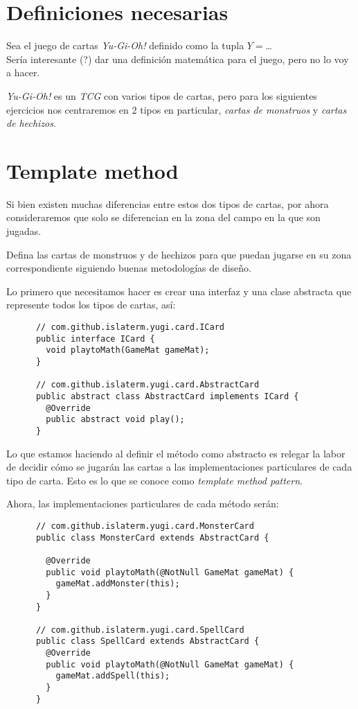 \section{Definiciones necesarias}
  Sea el juego de cartas \textit{Yu-Gi-Oh!} definido como la tupla 
  $Y = $\dots\\
  Sería interesante (?) dar una definición matemática para el juego, pero no lo voy a 
  hacer.

  \textit{Yu-Gi-Oh!} es un \textit{TCG} con varios tipos de cartas, pero para los 
  siguientes ejercicios nos centraremos en 2 tipos en particular, \textit{cartas de 
  monstruos} y \textit{cartas de hechizos}.

\section{Template method}
  \begin{Exercise}[title={Zonas de juego}, label={ex1}]
    Si bien existen muchas diferencias entre estos dos tipos de cartas, por ahora 
    consideraremos que solo se diferencian en la zona del campo en la que son jugadas.

    Defina las cartas de monstruos y de hechizos para que puedan jugarse en su zona 
    correspondiente siguiendo buenas metodologías de diseño.
  \end{Exercise}

  \begin{Answer}[ref={ex1}]
    Lo primero que necesitamos hacer es crear una interfaz y una clase abstracta que 
    represente todos los tipos de cartas, así:
    \begin{verbatim}
      // com.github.islaterm.yugi.card.ICard
      public interface ICard {
        void playtoMath(GameMat gameMat);
      }

      // com.github.islaterm.yugi.card.AbstractCard
      public abstract class AbstractCard implements ICard {
        @Override
        public abstract void play();
      }
    \end{verbatim}

    Lo que estamos haciendo al definir el método como abstracto es relegar la labor de 
    decidir cómo se jugarán las cartas a las implementaciones particulares de cada tipo de
    carta.
    Esto es lo que se conoce como \textit{template method pattern}.

    Ahora, las implementaciones particulares de cada método serán:
    \begin{verbatim}
      // com.github.islaterm.yugi.card.MonsterCard
      public class MonsterCard extends AbstractCard {

        @Override
        public void playtoMath(@NotNull GameMat gameMat) {
          gameMat.addMonster(this);
        }
      }

      // com.github.islaterm.yugi.card.SpellCard
      public class SpellCard extends AbstractCard {
        @Override
        public void playtoMath(@NotNull GameMat gameMat) {
          gameMat.addSpell(this);
        }
      }
    \end{verbatim}
  \end{Answer}
%  